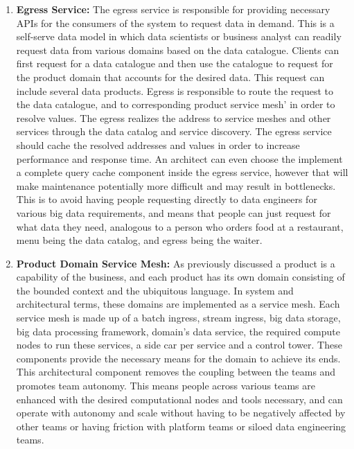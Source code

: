 \documentclass[review]{elsarticle}
\begin{document}
\begin{enumerate}
    \item \textbf{Egress Service:} The egress service is responsible for providing necessary APIs for the consumers of the system to request data in demand. This is a self-serve data model in which data scientists or business analyst can readily request data from various domains based on the data catalogue. Clients can first request for a data catalogue and then use the catalogue to request for the product domain that accounts for the desired data. This request can include several data products. Egress is responsible to route the request to the data catalogue, and to corresponding product service mesh' in order to resolve values. The egress realizes the address to service meshes and other services through the data catalog and service discovery. The egress service should cache the resolved addresses and values in order to increase performance and response time. An architect can even choose the implement a complete query cache component inside the egress service, however that will make maintenance potentially more difficult and may result in bottlenecks. This is to avoid having people requesting directly to data engineers for various big data requirements, and means that people can just request for what data they need, analogous to a person who orders food at a restaurant, menu being the data catalog, and egress being the waiter.
    \item \textbf{Product Domain Service Mesh:} As previously discussed a product is a capability of the business, and each product has its own domain consisting of the bounded context and the ubiquitous language. In system and architectural terms, these domains are implemented as a service mesh. Each service mesh is made up of a batch ingress, stream ingress, big data storage, big data processing framework, domain's data service, the required compute nodes to run these services, a side car per service and a control tower. These components provide the necessary means for the domain to achieve its ends. This architectural component removes the coupling between the teams and promotes team autonomy. This means people across various teams are enhanced with the desired computational nodes and tools necessary, and can operate with autonomy and scale without having to be negatively affected by other teams or having friction with platform teams or siloed data engineering teams. 

\end{enumerate}
\end{document}
